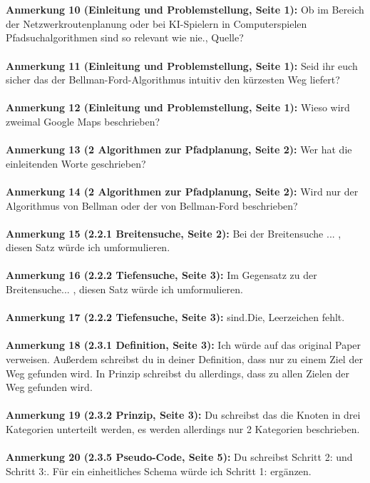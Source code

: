 \documentclass[a4paper,12pt]{book}
\begin{document}
\\ \\
\textbf{Anmerkung 10 (Einleitung und Problemstellung, Seite 1):}
\glqq Ob im Bereich der Netzwerkroutenplanung oder bei KI-Spielern in Computerspielen Pfadsuchalgorithmen sind so relevant wie nie.\grqq, Quelle? 
\\ \\
\textbf{Anmerkung 11 (Einleitung und Problemstellung, Seite 1):}
Seid ihr euch sicher das der Bellman-Ford-Algorithmus \glqq intuitiv\grqq{} den kürzesten Weg liefert?
\\ \\
\textbf{Anmerkung 12 (Einleitung und Problemstellung, Seite 1):}
Wieso wird zweimal Google Maps beschrieben? 
\\ \\
\textbf{Anmerkung 13 (2 Algorithmen zur Pfadplanung, Seite 2):}
Wer hat die einleitenden Worte geschrieben?
\\ \\
\textbf{Anmerkung 14 (2 Algorithmen zur Pfadplanung, Seite 2):}
Wird nur der Algorithmus von Bellman oder der von Bellman-Ford beschrieben?
\\ \\
\textbf{Anmerkung 15 (2.2.1 Breitensuche, Seite 2):}
\grqq Bei der Breitensuche ... \glqq, diesen Satz würde ich umformulieren.
\\ \\
\textbf{Anmerkung 16 (2.2.2 Tiefensuche, Seite 3):}
\grqq Im Gegensatz zu der Breitensuche... \glqq, diesen Satz würde ich umformulieren.
\\ \\
\textbf{Anmerkung 17 (2.2.2 Tiefensuche, Seite 3):}
\grqq sind.Die\grqq, Leerzeichen fehlt. 
\\ \\
\textbf{Anmerkung 18 (2.3.1 Definition, Seite 3):}
Ich würde auf das original Paper verweisen. Außerdem schreibst du in deiner Definition, dass nur zu einem Ziel der Weg gefunden wird. In Prinzip schreibst du allerdings, dass zu allen Zielen der Weg gefunden wird. 
\\ \\
\textbf{Anmerkung 19 (2.3.2 Prinzip, Seite 3):}
Du schreibst das die Knoten in drei Kategorien unterteilt werden, es werden allerdings nur 2 Kategorien beschrieben.
\\ \\
\textbf{Anmerkung 20 (2.3.5 Pseudo-Code, Seite 5):}
Du schreibst Schritt 2: und Schritt 3:. Für ein einheitliches Schema würde ich Schritt 1: ergänzen.
\end{document}
